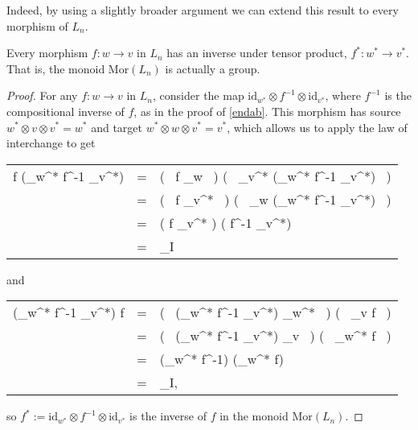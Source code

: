 \documentclass{amsbook} %
\numberwithin{section}{chapter}
\begin{document}
Indeed, by using a slightly broader argument we can extend this result to every morphism of $L_n$.

\begin{prop} \label{tensinv} Every morphism $f: w \to v$ in $L_n$ has an inverse under tensor product, $f^*: w^* \to v^*$. That is, the monoid $\mathrm{Mor}(L_n)$ is actually a group.
\end{prop}
\begin{proof}
For any $f: w \to v$ in $L_n$, consider the map $\mathrm{id}_{w^*} \otimes f^{-1} \otimes \mathrm{id}_{v^*}$, where $f^{-1}$ is the compositional inverse of $f$, as in the proof of \cref{endab}. This morphism has source $w^* \otimes v \otimes v^* = w^*$ and target $w^* \otimes w \otimes v^* = v^*$, which allows us to apply the law of interchange to get
\begin{longtable}{RLL}
			f \otimes (_{w^*} \otimes f^{-1} \otimes {}_{v^*}) & = & \big( \, f \circ {}_w \, \big) \otimes \big( \, _{v^*} \circ  (_{w^*} \otimes f^{-1} \otimes {}_{v^*}) \, \big) \\
			& = & \big( \, f \otimes {}_{v^*} \, \big) \circ \big( \, _w \otimes (_{w^*} \otimes f^{-1} \otimes {}_{v^*}) \, \big) \\
			& = & ( f \otimes {}_{v^*} ) \circ ( f^{-1} \otimes {}_{v^*}) \\
			& = & _I
\end{longtable}
and 
\begin{longtable}{RLL}
			(_{w^*} \otimes f^{-1} \otimes {}_{v^*}) \otimes f & = & \big( \, (_{w^*} \otimes f^{-1} \otimes {}_{v^*}) \circ {}_{w^*} \, \big) \otimes \big( \, _v \circ f \, \big) \\
			& = & \big( \, (_{w^*} \otimes f^{-1} \otimes {}_{v^*}) \otimes {}_v \, \big) \circ \big( \, _{w^*} \otimes f \, \big) \\
			& = & (_{w^*} \otimes f^{-1}) \circ (_{w^*} \otimes f) \\
			& = & _I,
\end{longtable}
so $f^* := \mathrm{id}_{w^*} \otimes f^{-1} \otimes \mathrm{id}_{v^*}$ is the inverse of $f$ in the monoid $\mathrm{Mor}(L_n)$.
\end{proof}

\end{document}

